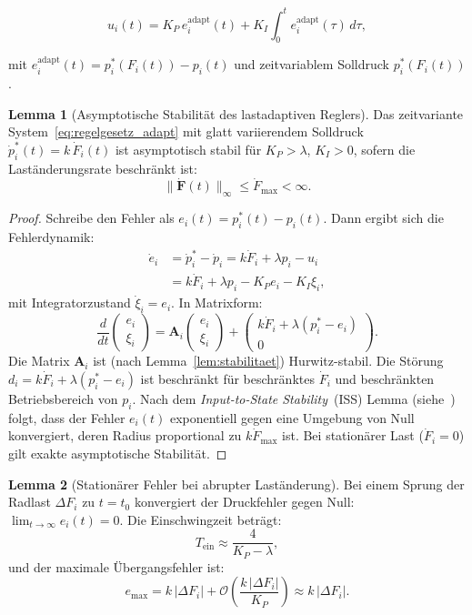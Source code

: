﻿\documentclass[a4paper,12pt]{article}
\theoremstyle{definition}
\newtheorem{lemma}{Lemma}
\begin{document}
\begin{equation}
    u_i(t) = K_P\, e^{\text{adapt}}_i(t) + K_I \int_0^t e^{\text{adapt}}_i(\tau)\,d\tau,
    \label{eq:regelgesetz_adapt}
\end{equation}

mit $e^{\text{adapt}}_i(t) = p^*_i(F_i(t)) - p_i(t)$ und zeitvariablem
Solldruck $p^*_i(F_i(t))$.

\begin{lemma}[Asymptotische Stabilität des lastadaptiven Reglers]
\label{lem:adapt_stab}
Das zeitvariante System~\eqref{eq:regelgesetz_adapt} mit glatt variierendem
Solldruck $\dot{p}^*_i(t) = k\,\dot{F}_i(t)$ ist asymptotisch stabil für
$K_P > \lambda$, $K_I > 0$, sofern die Laständerungsrate beschränkt ist:
\[
    \|\dot{\mathbf{F}}(t)\|_\infty \leq \dot{F}_{\max} < \infty.
\]
\end{lemma}

\begin{proof}
Schreibe den Fehler als $e_i(t) = p^*_i(t) - p_i(t)$. Dann ergibt sich
die Fehlerdynamik:
\begin{align*}
    \dot{e}_i &= \dot{p}^*_i - \dot{p}_i
    = k\dot{F}_i + \lambda p_i - u_i\\
    &= k\dot{F}_i + \lambda p_i - K_P e_i - K_I \xi_i,
\end{align*}
mit Integratorzustand $\dot{\xi}_i = e_i$. In Matrixform:
\[
    \frac{d}{dt}\begin{pmatrix}e_i\\\xi_i\end{pmatrix}
    = \mathbf{A}_i\begin{pmatrix}e_i\\\xi_i\end{pmatrix}
    + \begin{pmatrix}k\dot{F}_i + \lambda(p^*_i - e_i)\\0\end{pmatrix}.
\]
Die Matrix $\mathbf{A}_i$ ist (nach Lemma~\ref{lem:stabilitaet})
Hurwitz-stabil. Die Störung $d_i = k\dot{F}_i + \lambda(p^*_i - e_i)$
ist beschränkt für beschränktes $\dot{F}_i$ und beschränkten
Betriebsbereich von $p_i$. Nach dem \emph{Input-to-State Stability}~(ISS)
Lemma (siehe~\cite{khalil_nonlinear}) folgt, dass der Fehler $e_i(t)$
exponentiell gegen eine Umgebung von Null konvergiert, deren Radius
proportional zu $k\dot{F}_{\max}$ ist. Bei stationärer Last
($\dot{F}_i = 0$) gilt exakte asymptotische Stabilität.
\end{proof}

\begin{lemma}[Stationärer Fehler bei abrupter Laständerung]
\label{lem:sprung}
Bei einem Sprung der Radlast $\Delta F_i$ zu $t = t_0$ konvergiert der
Druckfehler gegen Null: $\lim_{t\to\infty} e_i(t) = 0$. Die Einschwingzeit
beträgt:
\[
    T_{\text{ein}} \approx \frac{4}{K_P - \lambda},
\]
und der maximale Übergangsfehler ist:
\[
    e_{\max} = k\,|\Delta F_i| + \mathcal{O}\!\left(\frac{k\,|\Delta F_i|}{K_P}\right)
    \approx k\,|\Delta F_i|.
\]
\end{lemma}
\end{document}
